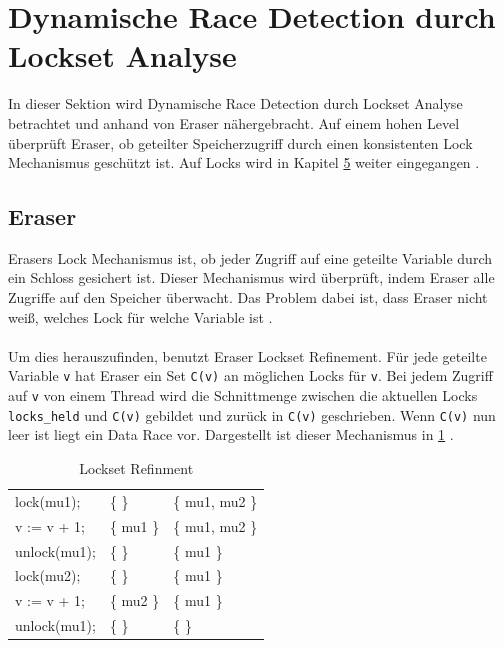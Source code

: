 \section{Dynamische Race Detection durch Lockset Analyse}

In dieser Sektion wird Dynamische Race Detection durch Lockset Analyse betrachtet und anhand von Eraser nähergebracht. Auf einem hohen Level überprüft Eraser, ob geteilter Speicherzugriff durch einen konsistenten Lock Mechanismus geschützt ist. Auf Locks wird in Kapitel \hyperref[sec:loesen]{5} weiter eingegangen \cite[vgl.][392]{savage_eraser_nodate}.

\subsection*{Eraser}

Erasers Lock Mechanismus ist, ob jeder Zugriff auf eine geteilte Variable durch ein Schloss gesichert ist. Dieser Mechanismus wird überprüft, indem Eraser alle Zugriffe auf den Speicher überwacht. Das Problem dabei ist, dass Eraser nicht weiß, welches Lock für welche Variable ist \cite[vgl.][396]{savage_eraser_nodate}. \\
\\
Um dies herauszufinden, benutzt Eraser Lockset Refinement. Für jede geteilte Variable \texttt{v} hat Eraser ein Set \texttt{C(v)} an möglichen Locks für \texttt{v}. Bei jedem Zugriff auf \texttt{v} von einem Thread wird die Schnittmenge zwischen die aktuellen Locks \texttt{locks\_held} und \texttt{C(v)} gebildet und zurück in \texttt{C(v)} geschrieben. Wenn \texttt{C(v)} nun leer ist liegt ein Data Race vor. Dargestellt ist dieser Mechanismus in \ref{tab:locksetRefinment} \cite[vgl.][396-397]{savage_eraser_nodate}. 

\begin{table}[h]
    \myfloatalign
    \begin{tabularx}{\textwidth}{XXX} \toprule
        \tableheadline{Program} & \tableheadline{locks\_held}
        & \tableheadline{C(v)} \\ 
        \midrule
        lock(mu1); & \{ \} &  \{ mu1, mu2 \} \\
        v := v + 1; & \{ mu1 \} & \{ mu1, mu2 \} \\
        unlock(mu1); & \{ \} & \{ mu1 \} \\
        \midrule
        lock(mu2); & \{ \} & \{ mu1 \} \\
        v := v + 1; & \{ mu2 \} & \{ mu1 \} \\
        unlock(mu1); & \{ \} & \{ \} \\
        \bottomrule
    \end{tabularx}
    \caption[Lockset Refinment]{Lockset Refinment \cite[397]{savage_eraser_nodate}}
    \label{tab:locksetRefinment}
\end{table}

